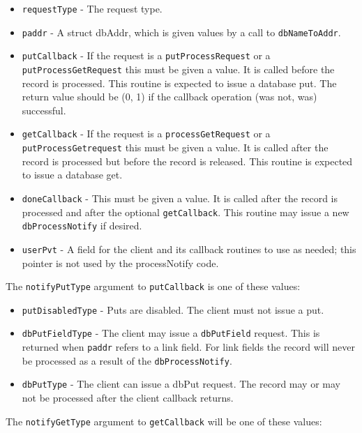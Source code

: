 \begin{itemize}
\item \verb|requestType| - The request type.

\item \verb|paddr| - A struct dbAddr, which is given values by a call to \verb|dbNameToAddr|.

\item \verb|putCallback| - If the request is a \verb|putProcessRequest| or a \verb|putProcessGetRequest| this must be given a value.
It is called before the record is processed.
This routine is expected to issue a database put.
The return value should be (0, 1) if the callback operation (was not, was) successful.

\item \verb|getCallback| - If the request is a \verb|processGetRequest| or a \verb|putProcessGetrequest| this must be given a value.
It is called after the record is processed but before the record is released.
This routine is expected to issue a database get.

\item \verb|doneCallback| - This must be given a value.
It is called after the record is processed and after the optional \verb|getCallback|.
This routine may issue a new \verb|dbProcessNotify| if desired.

\item \verb|userPvt| - A field for the client and its callback routines to use as needed; this pointer is not used by the processNotify code.
\end{itemize}

The \verb|notifyPutType| argument to \verb|putCallback| is one of these values:

\begin{itemize}
\item \verb|putDisabledType| - Puts are disabled.
The client must not issue a put.

\item \verb|dbPutFieldType| - The client may issue a \verb|dbPutField| request.
This is returned when \verb|paddr| refers to a link field.
For link fields the record will never be processed as a result of the \verb|dbProcessNotify|.

\item \verb|dbPutType| - The client can issue a dbPut request.
The record may or may not be processed after the client callback returns.
\end{itemize}

The \verb|notifyGetType| argument to \verb|getCallback| will be one of these values:

